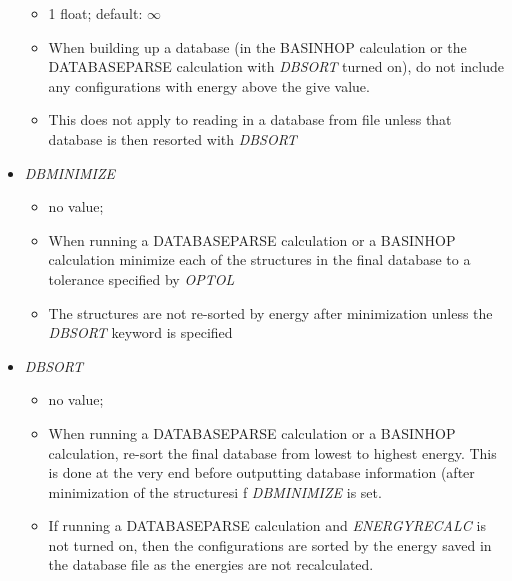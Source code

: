 \documentclass[12pt,dvips]{article}
\begin{document}
\begin{itemize}
\begin{itemize}
    \item 1 float; default: $\infty$
    \item When building up a database (in the BASINHOP calculation or the DATABASEPARSE calculation with {\em DBSORT} turned on), do not include any configurations with energy above the give value.
    \item This does not apply to reading in a database from file unless that database is then resorted with {\em DBSORT}
  \end{itemize}
%
\item {\it DBMINIMIZE}
  \begin{itemize}
    \item no value;
    \item When running a DATABASEPARSE calculation or a BASINHOP calculation minimize each of the structures in the final database to a tolerance specified by {\em OPTOL}
    \item The structures are not re-sorted by energy after minimization unless the {\em DBSORT} keyword is specified
  \end{itemize}
%
\item {\it DBSORT}
  \begin{itemize}
    \item no value;
    \item When running a DATABASEPARSE calculation or a BASINHOP calculation, re-sort the final database from lowest to highest energy. This is done at the very end before outputting database information (after minimization of the structuresi f {\em DBMINIMIZE} is set.
    \item If running a DATABASEPARSE calculation and {\em ENERGYRECALC} is not turned on, then the configurations are sorted by the energy saved in the database file as the energies are not recalculated.
  \end{itemize}
%

\end{itemize}
\end{document}
